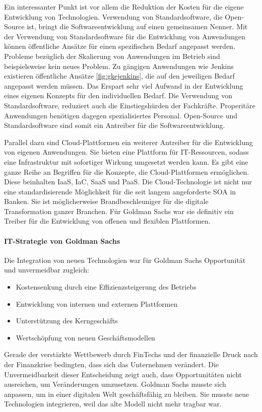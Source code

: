 Ein interessanter Punkt ist vor allem die Reduktion der Kosten für die eigene Entwicklung von Technologien. Verwendung von Standardsoftware, die Open-Source ist, bringt die Softwareentwicklung auf einen gemeinsamen Nenner. Mit der Verwendung von Standardsoftware für die Entwicklung von Anwendungen können öffentliche Ansätze für einen spezifischen Bedarf angepasst werden. Probleme bezüglich der Skalierung von Anwendungen im Betrieb sind beispielsweise kein neues Problem. Zu gängigen Anwendungen wie Jenkins existieren öffentliche Ansätze \ref{fig:gkejenkins}, die auf den jeweiligen Bedarf angepasst werden müssen. Das Erspart sehr viel Aufwand in der Entwicklung eines eigenen Konzepts für den individuellen Bedarf. Die Verwendung von Standardsoftware, reduziert auch die Einstiegshürden der Fachkräfte. Properitäre Anwendungen benötigen dagegen spezialisiertes Personal. Open-Source und Standardsoftware sind somit ein Antreiber für die Softwareentwicklung.

Parallel dazu sind Cloud-Plattformen ein weiterer Antreiber für die Entwicklung von eigenen Anwendungen. Sie bieten eine Plattform für IT-Ressourcen, sodass eine Infrastruktur mit sofortiger Wirkung umgesetzt werden kann. Es gibt eine ganze Reihe an Begriffen für die Konzepte, die Cloud-Plattformen ermöglichen. Diese beinhalten \ac{IaaS}, \ac{IaC}, \ac{SaaS} und \ac{PaaS}.
Die Cloud-Technologie ist nicht nur eine standardisierende Möglichkeit für die seit langem angeforderte \ac{SOA} \cite{Brockhoff2006} in Banken. Sie ist möglicherweise Brandbeschleuniger für die digitale Transformation ganzer Branchen. Für Goldman Sachs war sie definitiv ein Treiber für die Entwicklung von offenen und flexiblen Plattformen.
%
\paragraph{IT-Strategie von Goldman Sachs}
Die Integration von neuen Technologien war für Goldman Sachs Opportunität und unvermeidbar \cite{Gupta:2017} zugleich:
\begin{itemize}
    \item Kostensenkung durch eine Effizienzsteigerung des Betriebs
    \item Entwicklung von internen und externen Plattformen
    \item Unterstützung des Kerngeschäfts
    \item Wertschöpfung von neuen Geschäftsmodellen
\end{itemize}

Gerade der verstärkte Wettbewerb durch FinTechs und der finanzielle Druck nach der Finanzkrise bedingten, dass sich das Unternehmen verändert. Die Unvermeidbarkeit dieser Entscheidung zeigt auch, dass Opportunitäten nicht ausreichen, um Veränderungen umzusetzen. Goldman Sachs musste sich anpassen, um in einer digitalen Welt geschäftsfähig zu bleiben. Sie musste neue Technologien integrieren, weil das alte Modell nicht mehr tragbar war. 

